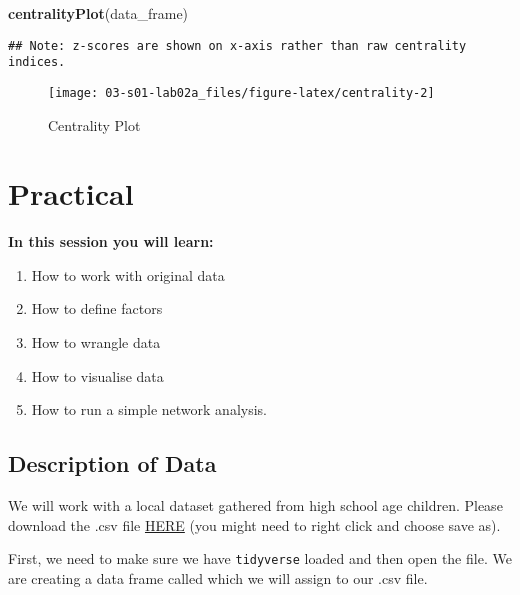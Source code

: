 \documentclass[]{book}
\newenvironment{Shaded}{\begin{snugshade}}{\end{snugshade}}
\newcommand{\KeywordTok}[1]{\textcolor[rgb]{0.13,0.29,0.53}{\textbf{#1}}}
\newcommand{\NormalTok}[1]{#1}
\providecommand{\tightlist}{%
  \setlength{\itemsep}{0pt}\setlength{\parskip}{0pt}}
\begin{document}
\begin{Shaded}
\begin{Highlighting}[]
\KeywordTok{centralityPlot}\NormalTok{(data_frame)}
\end{Highlighting}
\end{Shaded}

\begin{verbatim}
## Note: z-scores are shown on x-axis rather than raw centrality indices.
\end{verbatim}

\begin{figure}

{\centering \texttt{[image: 03-s01-lab02a\_files/figure-latex/centrality-2]} 

}

\caption{Centrality Plot}\label{fig:centrality2}
\end{figure}

\hypertarget{practical}{%
\chapter{Practical}\label{practical}}

\textbf{In this session you will learn:}

\begin{enumerate}
\def\labelenumi{\arabic{enumi}.}
\tightlist
\item
  How to work with original data
\item
  How to define factors
\item
  How to wrangle data
\item
  How to visualise data
\item
  How to run a simple network analysis.
\end{enumerate}

\hypertarget{description-of-data}{%
\section{Description of Data}\label{description-of-data}}

We will work with a local dataset gathered from high school age children. Please download the .csv file \href{data/networkdataset.csv}{HERE} (you might need to right click and choose save as).

First, we need to make sure we have \texttt{tidyverse} loaded and then open the file. We are creating a data frame called which we will assign to our .csv file.
\end{document}
